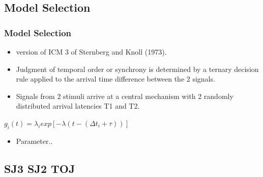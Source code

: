 \documentclass[xcolor={fixpdftex,hyperref,x11names},10pt,pdftex,hyperref={pdftex}]{beamer}
\begin{document}
\subsection{Model Selection}

\begin{frame}
  \frametitle{Model Selection}
  \begin{itemize}
          \item version of ICM 3 of Sternberg and Knoll (1973).
          \item  Judgment of temporal order or synchrony is determined by a ternary decision rule applied to the arrival time difference between the 2 signals.  
          \item  Signals from 2 stimuli arrive at a central mechanism with 2 randomly distributed arrival latencies T1 and T2.
      \end{itemize}
      $ g_i(t) = \lambda_i exp[-\lambda(t-(\Delta t_i + \tau ))]  $
 

  \begin{itemize}
      \item Parameter..
  \end{itemize}
\end{frame}

\subsection{SJ3 SJ2 TOJ}
\end{document}
